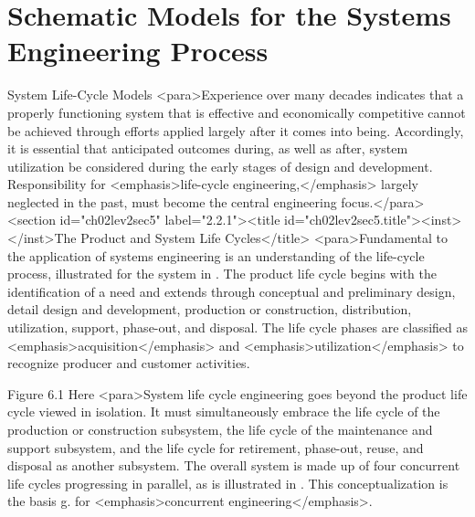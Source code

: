 \section{Schematic Models for the Systems Engineering Process}

System Life-Cycle Models
<para>Experience over many decades indicates that a properly functioning system that is effective and economically competitive cannot be achieved through efforts applied largely after it comes into being. Accordingly, it is essential that anticipated outcomes during, as well as after, system utilization be considered during the early stages of design and development. Responsibility for <emphasis>life-cycle engineering,</emphasis> largely neglected in the past, must become the central engineering focus.</para>
<section id="ch02lev2sec5" label="2.2.1"><title id="ch02lev2sec5.title"><inst></inst>The Product and System Life Cycles</title>
<para>Fundamental to the application of systems engineering is an understanding of the life-cycle process, illustrated for the system in . The product life cycle begins with the identification of a need and extends through conceptual and preliminary design, detail design and development, production or construction, distribution, utilization, support, phase-out, and disposal. The life cycle phases are classified as <emphasis>acquisition</emphasis> and <emphasis>utilization</emphasis> to recognize producer and customer activities.

Figure 6.1 Here
<para>System life cycle engineering goes beyond the product life cycle viewed in isolation. It must simultaneously embrace the life cycle of the production or construction subsystem, the life cycle of the maintenance and support subsystem, and the life cycle for retirement, phase-out, reuse, and disposal as another subsystem. The overall system is made up of four concurrent life cycles progressing in parallel, as is illustrated in . This conceptualization is the basis g. for <emphasis>concurrent engineering</emphasis>.

